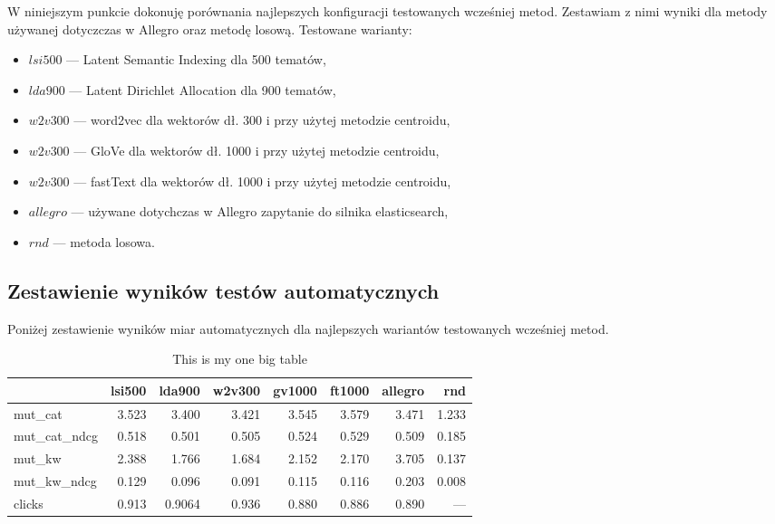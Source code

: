 \documentclass[pl]{minipw} %
\begin{document}
W niniejszym punkcie dokonuję porównania najlepszych konfiguracji testowanych wcześniej metod. Zestawiam z nimi wyniki dla metody używanej dotyczczas w Allegro oraz metodę losową.
Testowane warianty:
\begin{itemize}
	\item $lsi500$ --- Latent Semantic Indexing dla 500 tematów,
	\item $lda900$ --- Latent Dirichlet Allocation dla 900 tematów,
	\item $w2v300$ --- word2vec dla wektorów dł. 300 i przy użytej metodzie centroidu,
	\item $w2v300$ --- GloVe dla wektorów dł. 1000 i przy użytej metodzie centroidu,
	\item $w2v300$ --- fastText dla wektorów dł. 1000 i przy użytej metodzie centroidu,
	\item $allegro$ --- używane dotychczas w Allegro zapytanie do silnika elasticsearch,
	\item $rnd$ --- metoda losowa.
\end{itemize}
\subsection{Zestawienie wyników testów automatycznych}
Poniżej zestawienie wyników miar automatycznych dla najlepszych wariantów testowanych wcześniej metod.
\begin{table}
	\centering
	\begin{tabular}{lrrrrrrr}
		\hline
		&   lsi500 &    lda900 &    w2v300 &   gv1000 &   ft1000 &   allegro &          rnd \\
		\hline
		mut\_cat      & 3.523  & 3.400   & 3.421   & 3.545  & 3.579  &  3.471  &   1.233    \\
		mut\_cat\_ndcg & 0.518 & 0.501  & 0.505  & 0.524 & 0.529 &  0.509 &   0.185    \\
		mut\_kw       & 2.388  & 1.766   & 1.684   & 2.152  & 2.170  &  3.705  &   0.137   \\
		mut\_kw\_ndcg  & 0.129 & 0.096 & 0.091 & 0.115 & 0.116 &  0.203 &   0.008 \\
		clicks       & 0.913 & 0.9064  & 0.936  & 0.880 & 0.886 &  0.890 & ---          \\
		\hline
	\end{tabular}
	\caption{This is my one big table}
\end{table}
\end{document}
